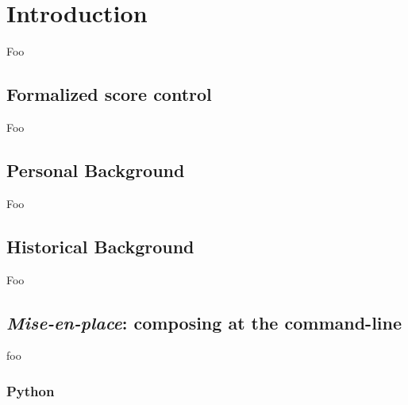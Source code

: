 \chapter{Introduction}
\label{chap:introduction}

Foo

\section{Formalized score control}

Foo

\section{Personal Background}

Foo

\section{Historical Background}

Foo

\section{\emph{Mise-en-place}: composing at the command-line}

foo

\subsection{Python}

